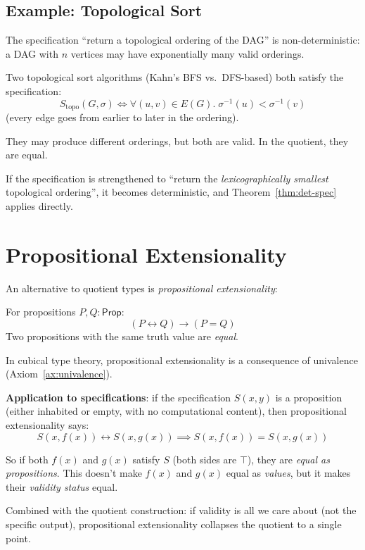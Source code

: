 \subsection{Example: Topological Sort}

The specification ``return a topological ordering of the DAG'' is
non-deterministic: a DAG with $n$ vertices may have exponentially
many valid orderings.

Two topological sort algorithms (Kahn's BFS vs.\ DFS-based) both
satisfy the specification:
\[
  S_{\mathrm{topo}}(G, \sigma) \iff \forall (u,v) \in E(G).\;
    \sigma^{-1}(u) < \sigma^{-1}(v)
\]
(every edge goes from earlier to later in the ordering).

They may produce different orderings, but both are valid.  In the
quotient, they are equal.

If the specification is strengthened to ``return the \emph{lexicographically
smallest} topological ordering'', it becomes deterministic, and
Theorem~\ref{thm:det-spec} applies directly.

\section{Propositional Extensionality}

An alternative to quotient types is \emph{propositional extensionality}:

\begin{axiom}
\label{ax:propext}
For propositions $P, Q : \mathsf{Prop}$:
\[
  (P \leftrightarrow Q) \to (P = Q)
\]
Two propositions with the same truth value are \emph{equal}.
\end{axiom}

In cubical type theory, propositional extensionality is a consequence
of univalence (Axiom~\ref{ax:univalence}).

\textbf{Application to specifications}: if the specification $S(x, y)$
is a proposition (either inhabited or empty, with no computational
content), then propositional extensionality says:
\[
  S(x, f(x)) \leftrightarrow S(x, g(x)) \implies
  S(x, f(x)) = S(x, g(x))
\]

So if both $f(x)$ and $g(x)$ satisfy $S$ (both sides are $\top$),
they are \emph{equal as propositions}.  This doesn't make $f(x)$
and $g(x)$ equal as \emph{values}, but it makes their \emph{validity
status} equal.

Combined with the quotient construction: if validity is all we care
about (not the specific output), propositional extensionality
collapses the quotient to a single point.


